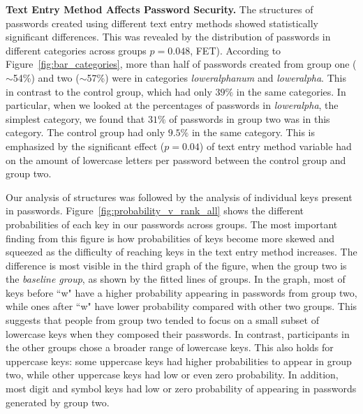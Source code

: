 \documentclass[conference]{IEEEtran}
\begin{document}
\textbf{Text Entry Method Affects Password Security.}  The structures of passwords created using different text entry methods showed statistically significant differences. This was revealed by the distribution of passwords in different categories across groups $p=0.048$, FET). According to Figure~\ref{fig:bar_categories}, more than half of passwords created from group one ($\sim$54\%) and two ($\sim$57\%) were in categories \emph{loweralphanum} and \emph{loweralpha}. This in contrast to the control group, which had only $39\%$ in the same categories. In particular, when we looked at the percentages of passwords in \emph{loweralpha}, the simplest category, we found that $31\%$ of passwords in group two was in this category. The control group had only $9.5\%$ in the same category. This is emphasized by the significant effect ($p=0.04$) of text entry method variable had on the amount of lowercase letters per password between the control group and group two. 


Our analysis of structures was followed by the analysis of individual keys present in passwords. Figure~\ref{fig:probability_v_rank_all} shows the different probabilities of each key in our passwords across groups. The most important finding from this figure is how probabilities of keys become more skewed and squeezed as the difficulty of reaching keys in the text entry method increases. The difference is most visible in the third graph of the figure, when the group two is the \emph{baseline group}, as shown by the fitted lines of groups. In the graph, most of keys before ``w" have a higher probability appearing in passwords from group two, while ones after ``w" have lower probability compared with other two groups. This suggests that people from group two tended to focus on a small subset of lowercase keys when they composed their passwords. In contrast, participants in the other groups chose a broader range of lowercase keys. This also holds for uppercase keys: some uppercase keys had higher probabilities to appear in group two, while other uppercase keys had low or even zero probability. In addition, most digit and symbol keys had low or zero probability of appearing in passwords generated by group two. 
\end{document}
